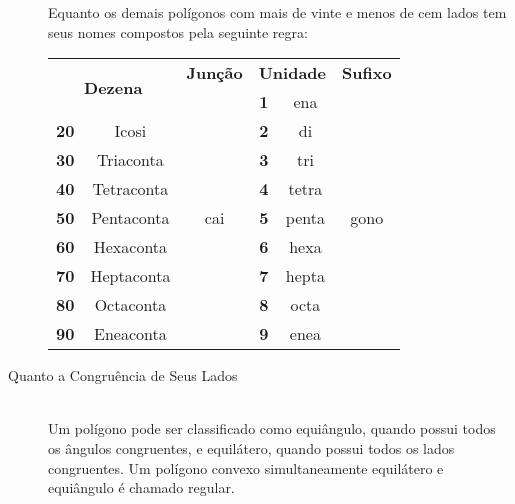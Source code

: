 \begin{description}
                Equanto os demais polígonos com mais de vinte e menos de cem lados tem seus nomes compostos pela seguinte regra:
                \begin{center}
                    \begin{tabular}{|cc|c|cc|c|}
                            \hline
                            \multicolumn{2}{|c|}{\multirow{2}{3em}{\textbf{Dezena}}} & \textbf{Junção} & \multicolumn{2}{c|}{\textbf{Unidade}} & \textbf{Sufixo} \\
                            && \multirow{9}{1em}{cai} & \textbf{1} & ena & \multirow{9}{2em}{gono} \\
                            \textbf{20} & Icosi && \textbf{2} & di &\\
                            \textbf{30} & Triaconta && \textbf{3} & tri &\\
                            \textbf{40} & Tetraconta && \textbf{4} & tetra &\\
                            \textbf{50} & Pentaconta && \textbf{5} & penta &\\
                            \textbf{60} & Hexaconta && \textbf{6} & hexa &\\
                            \textbf{70} & Heptaconta && \textbf{7} & hepta &\\
                            \textbf{80} & Octaconta && \textbf{8} & octa &\\
                            \textbf{90} & Eneaconta && \textbf{9} & enea &\\
                            \hline
                    \end{tabular}
                \end{center}
            \item[Quanto a Congruência de Seus Lados] \hfill \\
                Um polígono pode ser classificado como equiângulo, quando possui todos os ângulos congruentes, e equilátero, quando possui todos os lados congruentes. Um polígono convexo simultaneamente equilátero e equiângulo é chamado regular.
        \end{description}
